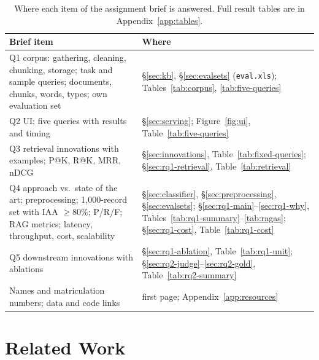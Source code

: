 \documentclass[11pt]{article}
\begin{document}
\begin{table}[t]
\centering\small
\begin{tabular}{@{}L{3.4cm}L{3.6cm}@{}}
\toprule
Brief item & Where \\
\midrule
Q1 corpus: gathering, cleaning, chunking, storage; task and sample queries; documents, chunks, words, types; own evaluation set & \S\ref{sec:kb}, \S\ref{sec:evalsets} (\texttt{eval.xls}); Tables~\ref{tab:corpus}, \ref{tab:five-queries} \\
Q2 UI; five queries with results and timing & \S\ref{sec:serving}; Figure~\ref{fig:ui}, Table~\ref{tab:five-queries} \\
Q3 retrieval innovations with examples; P@K, R@K, MRR, nDCG & \S\ref{sec:innovations}, Table~\ref{tab:fixed-queries}; \S\ref{sec:rq1-retrieval}, Table~\ref{tab:retrieval} \\
Q4 approach vs.\ state of the art; preprocessing; 1,000-record set with IAA $\ge 80\%$; P/R/F; RAG metrics; latency, throughput, cost, scalability & \S\ref{sec:classifier}, \S\ref{sec:preprocessing}, \S\ref{sec:evalsets}; \S\ref{sec:rq1-main}--\ref{sec:rq1-why}, Tables~\ref{tab:rq1-summary}--\ref{tab:ragas}; \S\ref{sec:rq1-cost}, Table~\ref{tab:rq1-cost} \\
Q5 downstream innovations with ablations & \S\ref{sec:rq1-ablation}, Table~\ref{tab:rq1-unit}; \S\ref{sec:rq2-judge}--\ref{sec:rq2-gold}, Table~\ref{tab:rq2-summary} \\
Names and matriculation numbers; data and code links & first page; Appendix~\ref{app:resources} \\
\bottomrule
\end{tabular}
\caption{Where each item of the assignment brief is answered. Full result tables are in Appendix~\ref{app:tables}.}
\label{tab:coverage}
\end{table}

\section{Related Work}
\label{sec:related}
\end{document}
